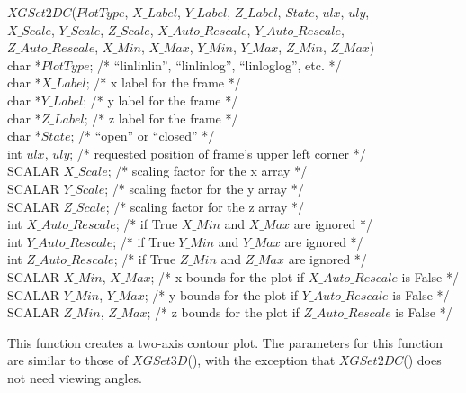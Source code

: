 \begin{flushleft}
$XGSet2DC$($PlotType$, $X\_Label$, $Y\_Label$, $Z\_Label$, $State$, $ulx$, $uly$, \\
\hspace{.8in} $X\_Scale$, $Y\_Scale$, $Z\_Scale$, $X\_Auto\_Rescale$, $Y\_Auto\_Rescale$, \\
\hspace{.8in} $Z\_Auto\_Rescale$, $X\_Min$, $X\_Max$, $Y\_Min$, $Y\_Max$, $Z\_Min$, $Z\_Max$) \\
char  *$PlotType$;          /* ``linlinlin'', ``linlinlog'', ``linloglog'', etc. */ \\
char  *$X\_Label$;           /* x label for the frame                            */ \\
char  *$Y\_Label$;           /* y label for the frame                            */ \\
char  *$Z\_Label$;           /* z label for the frame                            */ \\
char  *$State$;             /* ``open'' or ``closed''                            */ \\
int    $ulx$, $uly$;        /* requested position of frame's upper left corner    */ \\
SCALAR  $X\_Scale$;           /* scaling factor for the x array                   */ \\
SCALAR  $Y\_Scale$;           /* scaling factor for the y array                   */ \\
SCALAR  $Z\_Scale$;           /* scaling factor for the z array                   */ \\
int    $X\_Auto\_Rescale$;    /* if True $X\_Min$ and $X\_Max$ are ignored      */ \\
int    $Y\_Auto\_Rescale$;    /* if True $Y\_Min$ and $Y\_Max$ are ignored       */ \\
int    $Z\_Auto\_Rescale$;    /* if True $Z\_Min$ and $Z\_Max$ are ignored       */ \\
SCALAR  $X\_Min$, $X\_Max$;    /* x bounds for the plot if $X\_Auto\_Rescale$ is False  */ \\
SCALAR  $Y\_Min$, $Y\_Max$;    /* y bounds for the plot if $Y\_Auto\_Rescale$ is False  */ \\
SCALAR  $Z\_Min$, $Z\_Max$;    /* z bounds for the plot if $Z\_Auto\_Rescale$ is False  */
\end{flushleft}

This function creates a two-axis contour plot.  The parameters for this 
function are similar to those of $XGSet3D$(), with the exception that 
$XGSet2DC$() does not need viewing angles.

